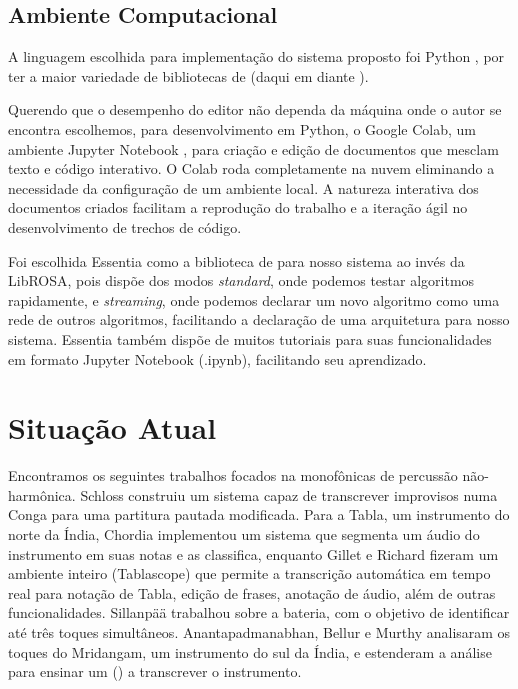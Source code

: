 \documentclass[
  dissertacao,
  brazil
]{ThesisPUC}
\begin{document}
\section{Ambiente Computacional}
A linguagem escolhida para implementação do sistema proposto foi Python \cite{van2011python}, por ter a maior variedade de bibliotecas de \mir \space (daqui em diante \MIR).

Querendo que o desempenho do editor não dependa da máquina onde o autor se encontra escolhemos, para desenvolvimento em Python, o Google Colab, um ambiente Jupyter Notebook \cite{kluyver2016jupyter}, para criação e edição de documentos que mesclam texto e código interativo. O Colab roda completamente na nuvem eliminando a necessidade da configuração de um ambiente local. A natureza interativa dos documentos criados facilitam a reprodução do trabalho e a iteração ágil no desenvolvimento de trechos de código.

Foi escolhida Essentia como a biblioteca de \MIR \space para nosso sistema ao invés da LibROSA, pois dispõe dos modos \emph{standard}, onde podemos testar algoritmos rapidamente, e \emph{streaming}, onde podemos declarar um novo algoritmo como uma rede de outros algoritmos, facilitando a declaração de uma arquitetura para nosso sistema. Essentia também dispõe de muitos tutoriais para suas funcionalidades em formato Jupyter Notebook (.ipynb), facilitando seu aprendizado.

\chapter{Situação Atual}

Encontramos os seguintes trabalhos focados na \TAM \space monofônicas de percussão não-harmônica. Schloss \cite{schloss1986automatic} construiu um sistema capaz de transcrever improvisos numa Conga para uma partitura pautada modificada. Para a Tabla, um instrumento do norte da Índia, Chordia \cite{chordia2005segmentation} implementou um sistema que segmenta um áudio do instrumento em suas notas e as classifica, enquanto Gillet e Richard \cite{gillet2003automatic} fizeram um ambiente inteiro (Tablascope) que permite a transcrição automática em tempo real para notação de Tabla, edição de frases, anotação de áudio, além de outras funcionalidades. Sillanpää \cite{sillanpaa2000drum} trabalhou sobre a bateria, com o objetivo de identificar até três toques simultâneos. Anantapadmanabhan, Bellur e Murthy \cite{anantapadmanabhan2013modal} analisaram os toques do Mridangam, um instrumento do sul da Índia, e estenderam a análise para ensinar um \hmm \space (\HMM) a transcrever o instrumento. 
\end{document}
